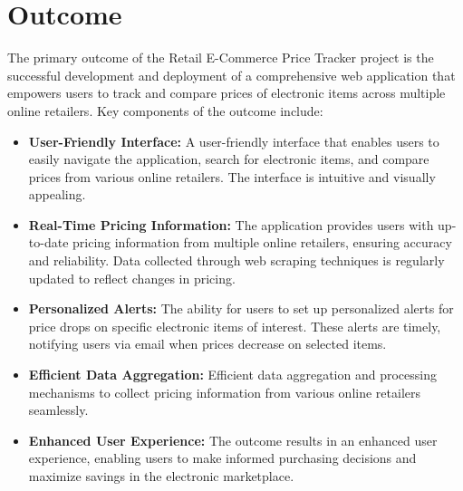 \documentclass[a4paper,14pt,onecolumn]{report}
\begin{document}
	\section{Outcome}
	The primary outcome of the Retail E-Commerce Price Tracker project is the successful development and deployment of a comprehensive web application that empowers users to track and compare prices of electronic items across multiple online retailers. Key components of the outcome include:
	\begin{itemize}
		\item \textbf{User-Friendly Interface:} A user-friendly interface that enables users to easily navigate the application, search for electronic items, and compare prices from various online retailers. The interface is intuitive and visually appealing.
		
		\item \textbf{Real-Time Pricing Information:} The application provides users with up-to-date pricing information from multiple online retailers, ensuring accuracy and reliability. Data collected through web scraping techniques is regularly updated to reflect changes in pricing.
		
		\item \textbf{Personalized Alerts:} The ability for users to set up personalized alerts for price drops on specific electronic items of interest. These alerts are timely, notifying users via email when prices decrease on selected items.
		
		\item \textbf{Efficient Data Aggregation:} Efficient data aggregation and processing mechanisms to collect pricing information from various online retailers seamlessly.
		
		\item \textbf{Enhanced User Experience:} The outcome results in an enhanced user experience, enabling users to make informed purchasing decisions and maximize savings in the electronic marketplace.
		
	\end{itemize}
	
\end{document}
